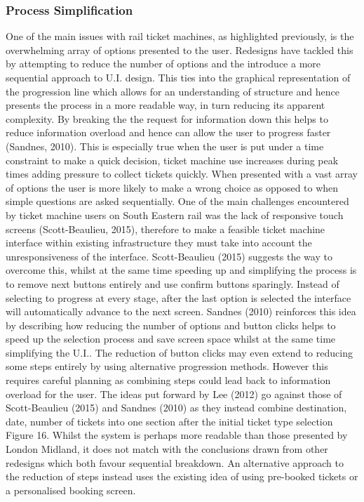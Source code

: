 \subsubsection{Process Simplification}
One of the main issues with rail ticket machines, as highlighted previously, is the overwhelming array of options presented to the user. Redesigns have tackled this by attempting to reduce the number of options and the introduce a more sequential approach to U.I. design. This ties into the graphical representation of the progression line which allows for an understanding of structure and hence presents the process in a more readable way, in turn reducing its apparent complexity. By breaking the the request for information down this helps to reduce information overload and hence can allow the user to progress faster  (Sandnes, 2010). This is especially true when the user is put under a time constraint to make a quick decision, ticket machine use increases during peak times adding pressure to collect tickets quickly. When presented with a vast array of options the user is more likely to make a wrong choice as opposed to when simple questions are asked sequentially.
One of the main challenges encountered by ticket machine users on South Eastern rail was the lack of responsive touch screens (Scott-Beaulieu, 2015), therefore to make a feasible ticket machine interface within existing infrastructure they must take into account the unresponsiveness of the interface. Scott-Beaulieu (2015) suggests the way to overcome this, whilst at the same time speeding up and simplifying the process is to remove next buttons entirely and use confirm buttons sparingly. Instead of selecting to progress at every stage, after the last option is selected the interface will automatically advance to the next screen. Sandnes (2010) reinforces this idea by describing how reducing the number of options and button clicks helps to speed up the selection process and save screen space whilst at the same time simplifying the U.I..
The reduction of button clicks may even extend to reducing some steps entirely by using alternative progression methods. However this requires careful planning as combining steps could lead back to information overload for the user. The ideas put forward by Lee (2012) go against those of Scott-Beaulieu (2015) and Sandnes (2010) as they instead combine destination, date, number of tickets into one section after the initial ticket type selection Figure 16. Whilst the system is perhaps more readable than those presented by London Midland, it does not match with the conclusions drawn from other redesigns which both favour sequential breakdown. An alternative approach to the reduction of steps instead uses the existing idea of using pre-booked tickets or a personalised booking screen.

